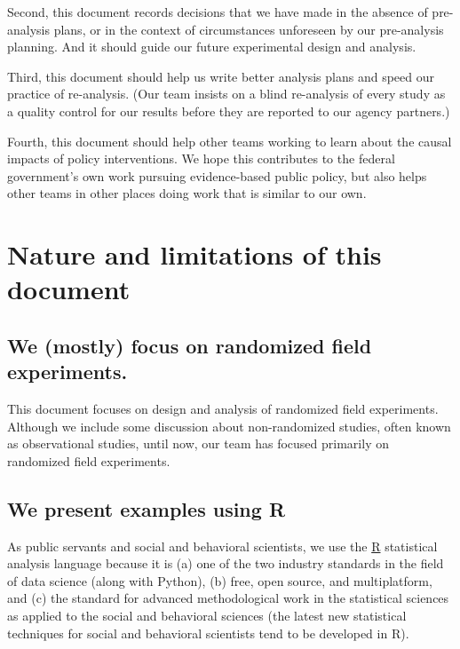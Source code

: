 \documentclass[
  12pt,
]{book}
\theoremstyle{definition}
\theoremstyle{definition}
\theoremstyle{definition}
\theoremstyle{remark}
\begin{document}
Second, this document records decisions that we have made in the absence
of pre-analysis plans, or in the context of circumstances unforeseen by
our pre-analysis planning. And it should guide our future experimental
design and analysis.

Third, this document should help us write better analysis plans and
speed our practice of re-analysis. (Our team insists on a blind
re-analysis of every study as a quality control for our results before
they are reported to our agency partners.)

Fourth, this document should help other teams working to learn about the
causal impacts of policy interventions. We hope this contributes to the
federal government's own work pursuing evidence-based public policy, but
also helps other teams in other places doing work that is similar to our
own.

\hypertarget{nature-and-limitations-of-this-document}{%
\section*{Nature and limitations of this
document}\label{nature-and-limitations-of-this-document}}

\hypertarget{we-mostly-focus-on-randomized-field-experiments.}{%
\subsection*{We (mostly) focus on randomized field
experiments.}\label{we-mostly-focus-on-randomized-field-experiments.}}

This document focuses on design and analysis of randomized field
experiments. Although we include some discussion about non-randomized
studies, often known as observational studies, until now, our team has
focused primarily on randomized field experiments.

\hypertarget{we-present-examples-using-r}{%
\subsection*{We present examples using
R}\label{we-present-examples-using-r}}

As public servants and social and behavioral scientists, we use the
\href{http://r-project.org}{R} statistical analysis language because it
is (a) one of the two industry standards in the field of data science
(along with Python), (b) free, open source, and multiplatform, and (c)
the standard for advanced methodological work in the statistical
sciences as applied to the social and behavioral sciences (the latest
new statistical techniques for social and behavioral scientists tend to
be developed in R).
\end{document}
